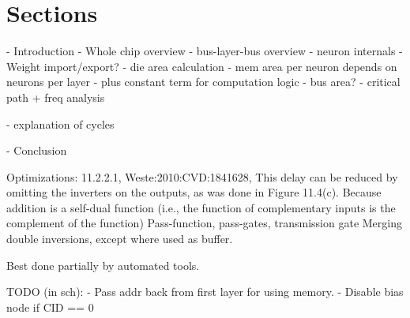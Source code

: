 \documentclass[twocolumn]{article}
\begin{document}
\section{Sections}
 - Introduction
 - Whole chip overview
 - bus-layer-bus overview
 - neuron internals
   - Weight import/export?
 - die area calculation
   - mem area per neuron depends on neurons per layer
   - plus constant term for computation logic
   - bus area?
 - critical path + freq analysis
   
 - explanation of cycles
 
 - Conclusion


Optimizations:
  11.2.2.1, Weste:2010:CVD:1841628, This delay can be reduced by omitting the inverters on the outputs, as was done in Figure 11.4(c). Because addition is a self-dual function (i.e., the function of complementary inputs is the complement of the function)
  Pass-function, pass-gates, transmission gate
  Merging double inversions, except where used as buffer.
  
  Best done partially by automated tools.


TODO (in sch):
  - Pass addr back from first layer for using memory.
  - Disable bias node if CID == 0
\end{document}

